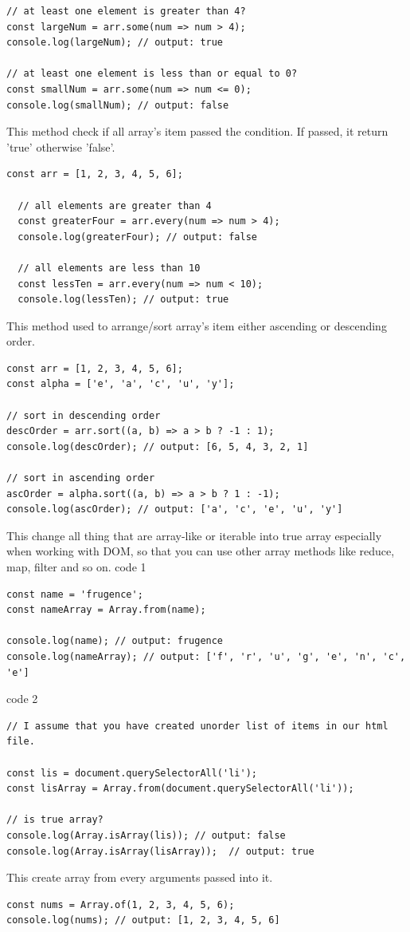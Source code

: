 \documentclass[10pt, a4paper, twocolumn]{article}
\begin{document}
\begin{description}[align=left]
\begin{lstlisting}
// at least one element is greater than 4?
const largeNum = arr.some(num => num > 4);
console.log(largeNum); // output: true

// at least one element is less than or equal to 0?
const smallNum = arr.some(num => num <= 0);
console.log(smallNum); // output: false
\end{lstlisting}
\item [every()] This method check if all array's item passed the condition. If passed, it return 'true' otherwise 'false'.
\begin{lstlisting}
const arr = [1, 2, 3, 4, 5, 6];

  // all elements are greater than 4
  const greaterFour = arr.every(num => num > 4);
  console.log(greaterFour); // output: false

  // all elements are less than 10
  const lessTen = arr.every(num => num < 10);
  console.log(lessTen); // output: true
\end{lstlisting}
\item [sort()] This method used to arrange/sort array's item either ascending or descending order.
\begin{lstlisting}
const arr = [1, 2, 3, 4, 5, 6];
const alpha = ['e', 'a', 'c', 'u', 'y'];

// sort in descending order
descOrder = arr.sort((a, b) => a > b ? -1 : 1);
console.log(descOrder); // output: [6, 5, 4, 3, 2, 1]

// sort in ascending order
ascOrder = alpha.sort((a, b) => a > b ? 1 : -1);
console.log(ascOrder); // output: ['a', 'c', 'e', 'u', 'y']
\end{lstlisting}
\item [Array.from()] This change all thing that are array-like or iterable into true array especially when working with DOM, so that you can use other array methods like reduce, map, filter and so on.
\newline\newline
code 1
\begin{lstlisting}
const name = 'frugence';
const nameArray = Array.from(name);

console.log(name); // output: frugence
console.log(nameArray); // output: ['f', 'r', 'u', 'g', 'e', 'n', 'c', 'e']
\end{lstlisting}
code 2
\begin{lstlisting}
// I assume that you have created unorder list of items in our html file.

const lis = document.querySelectorAll('li');
const lisArray = Array.from(document.querySelectorAll('li'));

// is true array?
console.log(Array.isArray(lis)); // output: false
console.log(Array.isArray(lisArray));  // output: true
\end{lstlisting}
\item [Array.of()] This create array from every arguments passed into it.
\begin{lstlisting}
const nums = Array.of(1, 2, 3, 4, 5, 6);
console.log(nums); // output: [1, 2, 3, 4, 5, 6]
\end{lstlisting}
\end{description}
\end{document}
